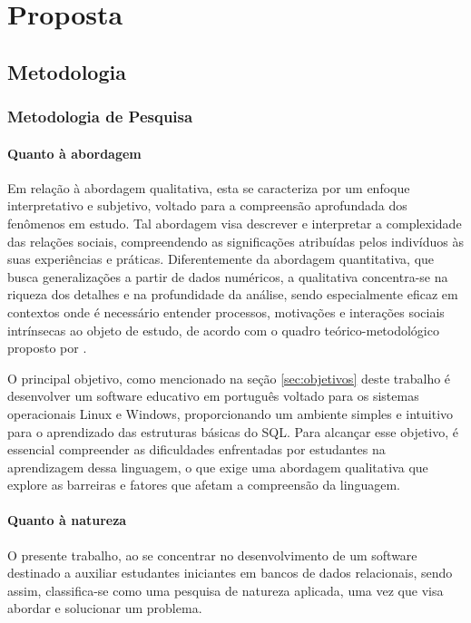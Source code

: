 \chapter[Proposta]{Proposta}
\label{sec:proposta}

\section{Metodologia}
\label{sec:metodologia}

\subsection{Metodologia de Pesquisa}
\label{sec:metodologia_de_pesquisa}
\subsubsection{Quanto à abordagem}

Em relação à abordagem qualitativa, esta se caracteriza por um enfoque interpretativo e subjetivo, voltado para a compreensão aprofundada dos fenômenos em estudo. Tal abordagem visa descrever e interpretar a complexidade das relações sociais, compreendendo as significações atribuídas pelos indivíduos às suas experiências e práticas. Diferentemente da abordagem quantitativa, que busca generalizações a partir de dados numéricos, a qualitativa concentra-se na riqueza dos detalhes e na profundidade da análise, sendo especialmente eficaz em contextos onde é necessário entender processos, motivações e interações sociais intrínsecas ao objeto de estudo, de acordo com o quadro teórico-metodológico proposto por \cite{Gerhardt2009}.

O principal objetivo, como mencionado na seção \ref{sec:objetivos} deste trabalho é desenvolver um software educativo em português voltado para os sistemas operacionais Linux e Windows, proporcionando um ambiente simples e intuitivo para o aprendizado das estruturas básicas do SQL. Para alcançar esse objetivo, é essencial compreender as dificuldades enfrentadas por estudantes na aprendizagem dessa linguagem, o que exige uma abordagem qualitativa que explore as barreiras e fatores que afetam a compreensão da linguagem.

\subsubsection{Quanto à natureza}

O presente trabalho, ao se concentrar no desenvolvimento de um software destinado a auxiliar estudantes iniciantes em bancos de dados relacionais, sendo assim, classifica-se como uma pesquisa de natureza aplicada, uma vez que visa abordar e solucionar um problema.\cite{Gerhardt2009} 


